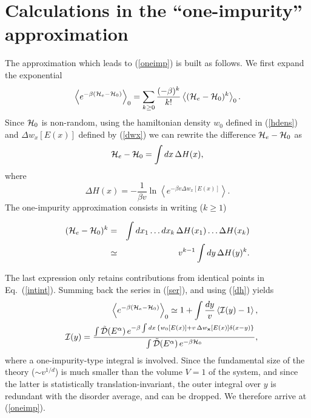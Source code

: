 \section{Calculations in the ``one-impurity'' approximation}
\label{appb}
The approximation which leads to (\ref{oneimp}) is built as follows. We first expand the exponential
\begin{equation}
\label{ser}
\left\langle e^{-\beta({\cal{H}}_e-{\cal{H}}_0)}\right\rangle_0=\sum_{k\geq 0}
{(-\beta)^k\over k!} \left\langle({\cal{H}}_e-{\cal{H}}_0)^k\right\rangle_0.
\end{equation}
Since ${\cal{H}}_0$ is non-random, using the hamiltonian
density $w_0$ defined in (\ref{hdens}) and $\Delta w_x[E(x)]$ defined by (\ref{dwx}) we can rewrite the difference ${\cal{H}}_e-{\cal{H}}_0$ as
\begin{equation}
{\cal{H}}_e-{\cal{H}}_0=\int dx\, \Delta H(x),
\end{equation}
where
\begin{equation}
\label{dh}
\Delta H(x)=-\frac{1}{\beta v}\ln\left\langle e^{-\beta v \Delta w_x[E(x)]}\right\rangle.
\end{equation}
The one-impurity approximation consists in writing ($k\geq 1$)
\begin{mathletters}
\begin{eqnarray}
\label{intint}
({\cal{H}}_e-{\cal{H}}_0)^k
&=&
\int dx_1\ldots dx_k\,\Delta H(x_1)
\ldots
\Delta H(x_k)\\
&\simeq& v^{k-1}\int dy\,
\Delta H(y)^k.
\end{eqnarray}
\end{mathletters}
The last expression only retains contributions from identical points
in Eq.\ (\ref{intint}). Summing back the series in (\ref{ser}), and using (\ref{dh}) yields
\begin{eqnarray}
\label{ebracko}
&&\left\langle e^{-\beta({\cal{H}}_e-{\cal{H}}_0)}\right\rangle_0
\simeq
1+\int{dy\over v}
\left\langle{\cal{I}}(y)-1\right\rangle,\\
\label{caliy}
&&{\cal{I}}(y)=\frac{\int \tilde{\cal{D}}(E^{\alpha})\, e^{-\beta\int dx\, \left\{w_0[E(x)] +v\,\Delta w_{\bf x}[E(x)] \delta(x-y)\right\}}}
{\int \tilde{\cal{D}}(E^{\alpha})\,e^{-\beta{\cal{H}}_0}},
\end{eqnarray}
where a one-impurity-type integral is involved. Since the fundamental
size of the theory ($\sim v^{1/d}$) is much smaller than the volume
$V=1$ of the system, and since the latter is statistically
translation-invariant, the outer integral over $y$ is redundant with
the disorder average, and can be dropped. We therefore arrive at
(\ref{oneimp}).

